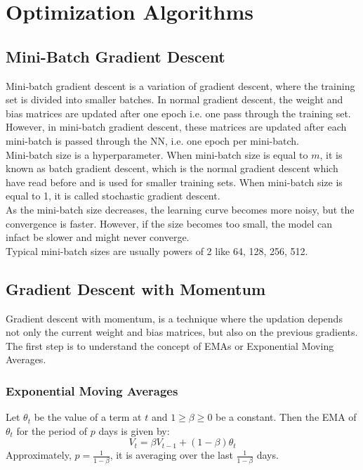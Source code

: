 \documentclass[12pt]{article}
\begin{document}
\section{Optimization Algorithms}
\subsection{Mini-Batch Gradient Descent}
Mini-batch gradient descent is a variation of gradient descent, where the training set is divided into smaller batches. In normal gradient descent, the weight and bias matrices are updated after one epoch i.e. one pass through the training set. However, in mini-batch gradient descent, these matrices are updated after each mini-batch is passed through the NN, i.e. one epoch per mini-batch.\\
Mini-batch size is a hyperparameter. When mini-batch size is equal to $m$, it is known as batch gradient descent, which is the normal gradient descent which have read before and is used for smaller training sets. When mini-batch size is equal to 1, it is called stochastic gradient descent.\\
As the mini-batch size decreases, the learning curve becomes more noisy, but the convergence is faster. However, if the size becomes too small, the model can infact be slower and might never converge.\\
Typical mini-batch sizes are usually powers of 2 like 64, 128, 256, 512.\\

\subsection{Gradient Descent with Momentum}
Gradient descent with momentum, is a technique where the updation depends not only the current weight and bias matrices, but also on the previous gradients.\\
The first step is to understand the concept of EMAs or Exponential Moving Averages.
\subsubsection*{Exponential Moving Averages}
Let $\theta_t$ be the value of a term at $t$ and $1 \ge \beta \ge 0$ be a constant. Then the EMA of $\theta_t$ for the period of $p$ days is given by:
\begin{equation}
    V_t = \beta V_{t-1} + (1-\beta) \theta_t
\end{equation}
Approximately, $p = \frac{1}{1-\beta}$, it is averaging over the last $\frac{1}{1-\beta}$ days.\\
\end{document}
